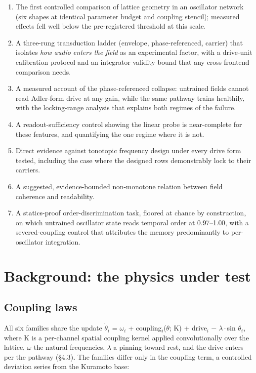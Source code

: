 \documentclass{article}
\makeatletter
\providecommand{\tightlist}{%
  \setlength{\itemsep}{0pt}\setlength{\parskip}{0pt}}
\newcommand{\iclr@floatbarrier}{\par\vspace{\z@}%
  \ifx\@deferlist\@empty\else\clearpage\fi}
\let\iclr@section\section
\renewcommand{\section}{\iclr@floatbarrier\iclr@section}
\makeatother
\begin{document}
\begin{enumerate}
\def\labelenumi{\arabic{enumi}.}
\tightlist
\item
  The first controlled comparison of lattice geometry in an oscillator
  network (six shapes at identical parameter budget and coupling
  stencil); measured effects fell well below the pre-registered
  threshold at this scale.
\item
  A three-rung transduction ladder (envelope, phase-referenced, carrier)
  that isolates \emph{how audio enters the field} as an experimental
  factor, with a drive-unit calibration protocol and an
  integrator-validity bound that any cross-frontend comparison needs.
\item
  A measured account of the phase-referenced collapse: untrained fields
  cannot read Adler-form drive at any gain, while the same pathway
  trains healthily, with the locking-range analysis that explains both
  regimes of the failure.
\item
  A readout-sufficiency control showing the linear probe is
  near-complete for these features, and quantifying the one regime where
  it is not.
\item
  Direct evidence against tonotopic frequency design under every drive
  form tested, including the case where the designed rows demonstrably
  lock to their carriers.
\item
  A suggested, evidence-bounded non-monotone relation between field
  coherence and readability.
\item
  A statics-proof order-discrimination task, floored at chance by
  construction, on which untrained oscillator state reads temporal order
  at 0.97--1.00, with a severed-coupling control that attributes the
  memory predominantly to per-oscillator integration.
\end{enumerate}

\section{Background: the physics under
test}\label{background-the-physics-under-test}

\subsection{Coupling laws}\label{coupling-laws}

All six families share the update \ensuremath{\dot{\theta}_{i}} =
\ensuremath{\omega_{i}} + coupling\ensuremath{_{i}}(\ensuremath{\theta};
K) + drive\ensuremath{_{i}} \ensuremath{-} \ensuremath{\lambda\cdot}sin
\ensuremath{\theta_{i}}, where K is a per-channel spatial coupling
kernel applied convolutionally over the lattice, \ensuremath{\omega} the
natural frequencies, \ensuremath{\lambda} a pinning toward rest, and the
drive enters per the pathway (§4.3). The families differ only in the
coupling term, a controlled deviation series from the Kuramoto base:
\end{document}

